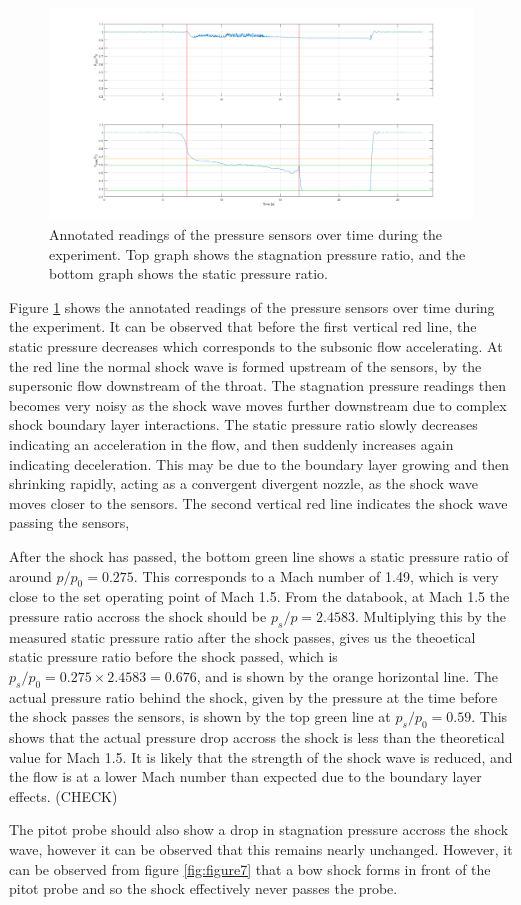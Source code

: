 \documentclass[8pt]{article}
\begin{document}
\begin{figure}[H]
    \centering
    \includegraphics[width=1\textwidth]{tunnel_pressures_annotated.png}
    \caption{Annotated readings of the pressure sensors over time during the experiment. Top graph shows the stagnation pressure ratio, and the bottom graph shows the static pressure ratio.}
    \label{fig:figure8}
\end{figure}

Figure \ref{fig:figure8} shows the annotated readings of the pressure sensors over time during the experiment.
It can be observed that before the first vertical red line, the static pressure decreases which corresponds to the subsonic flow accelerating.
At the red line the normal shock wave is formed upstream of the sensors, by the supersonic flow downstream of the throat.
The stagnation pressure readings then becomes very noisy as the shock wave moves further downstream due to complex shock boundary layer interactions.
The static pressure ratio slowly decreases indicating an acceleration in the flow, and then suddenly increases again indicating deceleration.
This may be due to the boundary layer growing and then shrinking rapidly, acting as a convergent divergent nozzle, as the shock wave moves closer to the sensors.
The second vertical red line indicates the shock wave passing the sensors,

After the shock has passed, the bottom green line shows a static pressure ratio of around $p/p_0 = 0.275$. This corresponds to a Mach number of 1.49, which is very close to the set operating point of Mach 1.5.
From the databook, at Mach 1.5 the pressure ratio accross the shock should be $p_s/p = 2.4583$.
Multiplying this by the measured static pressure ratio after the shock passes, gives us the theoetical static pressure ratio before the shock passed, which is $p_s/p_0 = 0.275 \times 2.4583 = 0.676$, and is shown by the orange horizontal line.
The actual pressure ratio behind the shock, given by the pressure at the time before the shock passes the sensors, is shown by the top green line at $p_s/p_0 = 0.59$.
This shows that the actual pressure drop accross the shock is less than the theoretical value for Mach 1.5.
It is likely that the strength of the shock wave is reduced, and the flow is at a lower Mach number than expected due to the boundary layer effects. (CHECK)

The pitot probe should also show a drop in stagnation pressure accross the shock wave, however it can be observed that this remains nearly unchanged.
However, it can be observed from figure \ref{fig:figure7} that a bow shock forms in front of the pitot probe and so the shock effectively never passes the probe.
\end{document}
